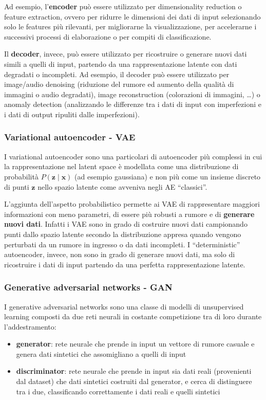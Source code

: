 Ad esempio, l'\textbf{encoder} può essere utilizzato per dimensionality reduction o feature extraction, ovvero per ridurre
le dimensioni dei dati di input selezionando solo le features più rilevanti, per migliorarne la visualizzazione, per
accelerarne i successivi processi di elaborazione o per compiti di classificazione.

Il \textbf{decoder}, invece, può essere utilizzato per ricostruire o generare nuovi dati simili a quelli di input, partendo
da una rappresentazione latente con dati degradati o incompleti. Ad esempio, il decoder può essere utilizzato per image/audio
denoising (riduzione del rumore ed aumento della qualità di immagini o audio degradati), image reconstruction (colorazioni
di immagini, \dots) o anomaly detection (analizzando le differenze tra i dati di input con imperfezioni e i dati di output
ripuliti dalle imperfezioni).

\subsubsection*{Variational autoencoder - VAE}
I variational autoencoder sono una particolari di autoencoder più complessi in cui la rappresentazione nel latent space è
modellata come una distribuzione di probabilità \(P(\textbf{z} \mid \textbf{x})\) (ad esempio gaussiana) e non più come un
insieme discreto di punti \(\textbf{z}\) nello spazio latente come avveniva negli AE ``classici''.

L'aggiunta dell'aspetto probabilistico permette ai VAE di rappresentare maggiori informazioni con meno parametri, di essere
più robusti a rumore e di \textbf{generare nuovi dati}. Infatti i VAE sono in grado di costruire nuovi dati campionando punti
dallo spazio latente secondo la distribuzione appresa quando vengono perturbati da un rumore in ingresso o da dati incompleti.
I ``deterministic'' autoencoder, invece, non sono in grado di generare nuovi dati, ma solo di ricostruire i dati di input
partendo da una perfetta rappresentazione latente.

\subsubsection*{Generative adversarial networks - GAN}
I generative adversarial networks sono una classe di modelli di unsupervised learning composti da due reti neurali in
costante competizione tra di loro durante l'addestramento:
\begin{itemize}
	\item \textbf{generator}: rete neurale che prende in input un vettore di rumore casuale e genera dati sintetici che
	assomigliano a quelli di input
	\item \textbf{discriminator}: rete neurale che prende in input sia dati reali (provenienti dal dataset) che dati sintetici
	costruiti dal generator, e cerca di distinguere tra i due, classificando correttamente i dati reali e quelli sintetici
\end{itemize}

